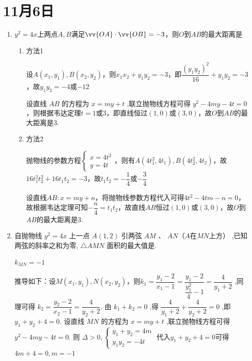 \section*{11月6日}
\begin{enumerate}
    \item $y^2 = 4x$上两点$A, B$满足$\vv{OA}\cdot \vv{OB} = -3$，则$O$到$AB$的最大距离是
    \begin{jieda}
        \begin{enumerate}
            \item 方法1

            设$A(x_1, y_1), B(x_2, y_2)$，则$x_1x_2+y_1y_2=-3$，即$\dfrac{(y_1y_2)^2}{16}+y_1y_2 = -3$，故$y_1y_2 = -4$或$-12$

            设直线 $AB$ 的方程为 $x = {m}y + {t}$ ,联立抛物线方程可得 ${y^2} - 4{m}y - 4{t} = 0$，则根据韦达定理$t = 1$或$3$，即直线恒过$(1, 0)$或$(3, 0)$，故$O$到$AB$的最大距离是$3$.

            \item 方法2

            抛物线的参数方程$\left\{\begin{array}{l}
                 x = 4t^2 \\
                 y = 4t
            \end{array}\right.$，则有$A(4t_1^2, 4t_1), B(4t_2^2, 4t_2)$，故$16t_1^2t_2^2+16t_1t_2 = -3$，故$t_1t_2 = -\dfrac{1}{4}$或$-\dfrac{3}{4}$

            设直线$AB: x = my+n$，将抛物线参数方程代入可得$4t^2 - 4tm-n = 0$，故根据韦达定理可知$-\dfrac{n}{4} = t_1t_2$，故直线$AB$恒过$(1, 0)$或$(3, 0)$，故$O$到$AB$的最大距离是$3$.
        \end{enumerate}
        
    \end{jieda}
    \item 自抛物线 ${y}^{2} = {4x}$ 上一点 $A\left( {1,2}\right)$ 引两弦 ${AM}\text{ 、 }{AN}$（$A$在$MN$上方） ,已知两弦的斜率之和为零, $\bigtriangleup  {AMN}$ 面积的最大值是.
    \begin{jieda}
        $k_{MN} = -1$
        
        推导如下：设$M\left( {{x}_{1},{y}_{1}}\right) ,N\left( {{x}_{2},{y}_{2}}\right)$，则${k}_{1} = \dfrac{{y}_{1} - 2}{{x}_{1} - 1} = \dfrac{{y}_{1} - 2}{\dfrac{{y}_{1}^{2}}{4} - 1} = \dfrac{4}{{y}_{1} + 2}$ ,同理可得 ${k}_{2} = \dfrac{{y}_{2} - 2}{{x}_{2} - 1} = \dfrac{4}{{y}_{2} + 2}$. 
        由 ${k}_{1} + {k}_{2} = 0$ ,得 $\dfrac{4}{{y}_{1} + 2} + \dfrac{4}{{y}_{2} + 2} = 0$ ,即 ${y}_{1} + {y}_{2} + 4 = 0$. 
        设直线 $MN$ 的方程为 $x = {m}y + {t}$ ,联立抛物线方程可得 ${y^2} - 4{m}y - 4{t} = 0$. 
        则 $\Delta  > 0, \left\{\begin{array}{l}
             {y}_{1} + {y}_{2} = 4{m}  \\
             {y}_{1}{y}_{2} =  - 4{t} 
        \end{array}\right.$ 代入${y}_{1} + {y}_{2} + 4 = 0$可得 $4{m} + 4 = 0,{m} =  - 1$
        

\end{jieda}
\end{enumerate}
